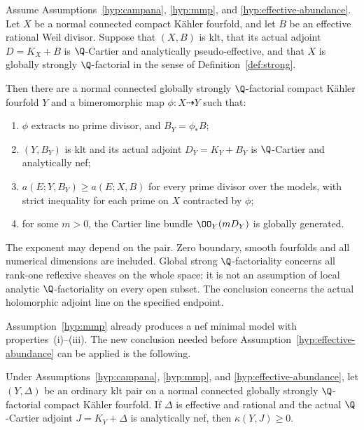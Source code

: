 \begin{theorem}\label{thm:main}
Assume Assumptions~\ref{hyp:campana}, \ref{hyp:mmp}, and
\ref{hyp:effective-abundance}. Let \(X\) be a normal connected
compact K\"ahler fourfold, and let \(B\) be an effective rational
Weil divisor. Suppose that \((X,B)\) is klt, that its actual adjoint
\(D=K_X+B\) is \(\Q\)-Cartier and analytically
pseudo-effective, and that \(X\) is globally strongly
\(\Q\)-factorial in the sense of Definition~\ref{def:strong}.

Then there are a normal connected globally strongly
\(\Q\)-factorial compact K\"ahler fourfold \(Y\) and a
bimeromorphic map \(\phi:X\dashrightarrow Y\) such that:
\begin{enumerate}[label=\textup{(\roman*)}]
\item \(\phi\) extracts no prime divisor, and
      \(B_Y=\phi_*B\);
\item \((Y,B_Y)\) is klt and its actual adjoint
      \(D_Y=K_Y+B_Y\) is \(\Q\)-Cartier and analytically nef;
\item \(a(E;Y,B_Y)\ge a(E;X,B)\) for every prime divisor over
      the models, with strict inequality for each prime on \(X\)
      contracted by \(\phi\);
\item for some \(m>0\), the Cartier line bundle
      \(\OO_Y(mD_Y)\) is globally generated.
\end{enumerate}
\end{theorem}

The exponent may depend on the pair. Zero boundary, smooth fourfolds
and all numerical dimensions are included. Global strong
\(\Q\)-factoriality concerns all rank-one reflexive sheaves on
the whole space; it is not an assumption of local analytic
\(\Q\)-factoriality on every open subset. The conclusion concerns
the actual holomorphic adjoint line on the specified endpoint.

Assumption~\ref{hyp:mmp} already produces a nef minimal model with
properties~\textup{(i)}--\textup{(iii)}. The new conclusion needed
before Assumption~\ref{hyp:effective-abundance} can be applied is
the following.

\begin{theorem}
\label{thm:nonvanishing}
Under Assumptions~\ref{hyp:campana}, \ref{hyp:mmp}, and
\ref{hyp:effective-abundance}, let \((Y,\Delta)\) be an ordinary
klt pair on a normal connected globally strongly
\(\Q\)-factorial compact K\"ahler fourfold. If \(\Delta\)
is effective and rational and the actual \(\Q\)-Cartier adjoint
\(J=K_Y+\Delta\) is analytically nef, then
\(\kappa(Y,J)\ge0\).
\end{theorem}

